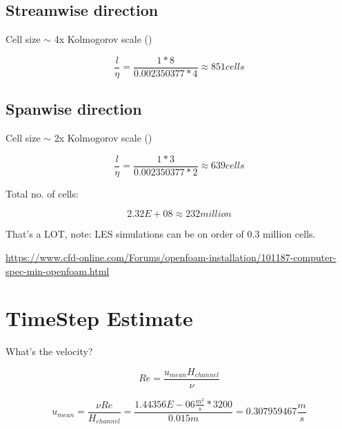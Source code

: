 \documentclass[12pt]{article}
\renewcommand{\_}{\kern-1.5pt\textunderscore\kern-1.5pt}
\begin{document}
\subsection{Streamwise direction}\par

Cell size $ \sim $  4x Kolmogorov scale (\cite{Komen2014})\par

 \[ \frac{l}{ \eta }=\frac{1\ast8}{0.002350377\ast4} \approx 851 cells \] \par

\subsection{Spanwise direction}\par

Cell size $ \sim $  2x Kolmogorov scale (\cite{Komen2014})\par

 \[ \frac{l}{ \eta }=\frac{1\ast3}{0.002350377\ast2} \approx 639 cells \] \par

Total no. of cells:\par

 \[ 2.32E+08 \approx 232 million \] \par

That’s a LOT, note: LES simulations can be on order of  \( \text{0.3 million} \)  cells.\par

\href{https://www.cfd-online.com/Forums/openfoam-installation/101187-computer-spec-min-openfoam.html}{https://www.cfd-online.com/Forums/openfoam-installation/101187-computer-spec-min-openfoam.html}\par


\vspace{\baselineskip}
\section{TimeStep Estimate}\par

What’s the velocity?\par

 \[ Re=\frac{u_{mean}H_{channel}}{ \nu } \] \par

 \[ u_{mean}=\frac{ \nu Re}{H_{channel}}=\frac{1.44356E-06\frac{m^{2}}{s}\ast3200}{0.015m}=0.307959467\frac{m}{s} \] \par
\end{document}
